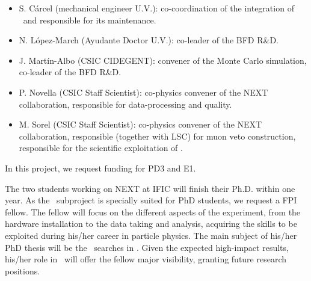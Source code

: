 \begin{itemize}[noitemsep,topsep=0pt,parsep=0pt,partopsep=0pt]
    \item S. C\'arcel (mechanical engineer U.V.): co-coordination of the integration of \Next\ and responsible for its maintenance.
    \item N. L\'opez-March (Ayudante Doctor U.V.): co-leader of the BFD R\&D.
    \item J. Mart\'in-Albo (CSIC CIDEGENT): convener of the Monte Carlo simulation, co-leader of the BFD R\&D. 
    \item P. Novella (CSIC Staff Scientist): co-physics convener of the NEXT collaboration, responsible for data-processing and quality.
    \item M. Sorel (CSIC Staff Scientist): co-physics convener of the NEXT collaboration, responsible (together with LSC) for muon veto construction, responsible for the scientific exploitation of \Next.
\end{itemize}


In this project, we request funding for PD3 and E1. 

The two students working on NEXT at IFIC will finish their Ph.D. within one year. As the \sIFIC\ subproject is specially suited for PhD students, we request a FPI fellow.  The fellow will focus on the different aspects of the experiment, from the hardware installation to the data taking and analysis, acquiring the skills to be exploited during his/her career in particle physics. The main subject of his/her PhD thesis will be the \bb\ searches in \Next. Given the expected high-impact results, his/her role in \Next\ will
offer the fellow major visibility, granting future research positions.


